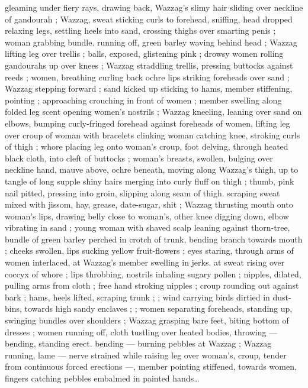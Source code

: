 gleaming under fiery rays, drawing back, Wazzag's slimy hair sliding 
over neckline of gandourah ; Wazzag, sweat sticking curls to 
forehead, sniffing, head dropped relaxing legs, settling heels into 
sand, crossing thighs over smarting penis ; woman grabbing bundle. 
running off, green barley waving behind head ; Wazzag lifting leg 
over trellis ; balls, exposed, glistening pink ; drowsy women rolling 
gandourahs up over knees ; Wazzag straddling trellis, pressing 
buttocks against reeds ; women, breathing curling back ochre lips 
striking foreheads over sand ; Wazzag stepping forward ; sand kicked 
up sticking to hams, member stiffening, pointing ; approaching 
crouching in front of women ; member swelling along folded leg 
scent opening women's nostrils ; Wazzag kneeling, leaning over sand 
on elbows, bumping curly-fringed forehead against foreheads of 
women, lifting leg over croup of woman with bracelets clinking 
woman catching knee, stroking curls of thigh ; whore placing leg 
onto woman's croup, foot delving, through heated black cloth, into 
cleft of buttocks ; woman's breasts, swollen, bulging over neckline 
hand, mauve above, ochre beneath, moving along Wazzag's thigh, up 
to tangle of long supple shiny hairs merging into curly fluff on thigh 
; thumb, pink nail pitted, pressing into groin, slipping along seam of 
thigh. scraping sweat mixed with jissom, hay, grease, date-sugar, shit 
; Wazzag thrusting mouth onto woman's lips, drawing belly close to 
woman's, other knee digging down, elbow vibrating in sand ; young 
woman with shaved scalp leaning against thorn-tree, bundle of green 
barley perched in crotch of trunk, bending branch towards mouth ; 
cheeks swollen, lips sucking yellow fruit-flowers ; eyes staring, 
through arms of women interlaced, at Wazzag's member swelling in 
jerks. at sweat rising over coccyx of whore ; lips throbbing, nostrils 
inhaling sugary pollen ; nipples, dilated, pulling arms from cloth ; 
free hand stroking nipples ; croup rounding out against bark ; hams, 
heels lifted, scraping trunk ; ; wind carrying birds dirtied in dust- 
bins, towards high sandy enclaves ; ; women separating foreheads, 
standing up, swinging bundles over shoulders ; Wazzag grasping 
bare feet, biting bottom of dresses ; women running off, cloth 
tustling over heated bodies, throwing --- bending, standing erect. 
bending --- burning pebbles at Wazzag ; Wazzag running, lame --- 
nerve strained while raising leg over woman's, croup, tender from 
continuous forced erections ---, member pointing stiffened, towards 
women, fingers catching pebbles embalmed in painted hands{\ldots} 
